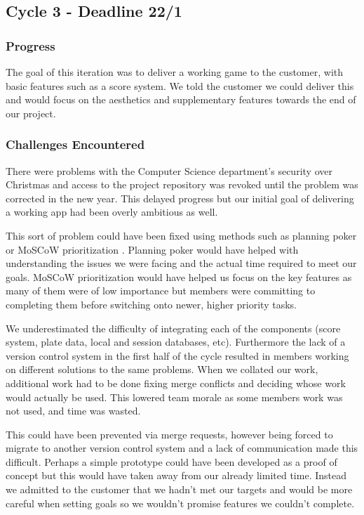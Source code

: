 \documentclass{l3proj}
\begin{document}
\subsection{Cycle 3 - Deadline 22/1}
\subsubsection{Progress}
The goal of this iteration was to deliver a working game to the customer, with basic features such as a score system. We told the customer we could deliver this and would focus on the aesthetics and supplementary features towards the end of our project.

\subsubsection{Challenges Encountered}
There were problems with the Computer Science department's security over Christmas and access to the project repository was revoked until the problem was corrected in the new year. This delayed progress but our initial goal of delivering a working app had been overly ambitious as well. 

This sort of problem could have been fixed using methods such as planning poker \cite{poker} or MoSCoW prioritization \cite{moscow}. Planning poker would have helped with understanding the issues we were facing and the actual time required to meet our goals. MoSCoW prioritization would have helped us focus on the key features as many of them were of low importance but members were committing to completing them before switching onto newer, higher priority tasks. 

We underestimated the difficulty of integrating each of the components (score system, plate data, local and session databases, etc). Furthermore the lack of a version control system in the first half of the cycle resulted in members working on different solutions to the same problems. When we collated our work, additional work had to be done fixing merge conflicts and deciding whose work would actually be used. This lowered team morale as some members work was not used, and time was wasted.

This could have been prevented via merge requests, however being forced to migrate to another version control system and a lack of communication made this difficult. Perhaps a simple prototype could have been developed as a proof of concept but this would have taken away from our already limited time. Instead we admitted to the customer that we hadn't met our targets and would be more careful when setting goals so we wouldn't promise features we couldn't complete. 
\end{document}
